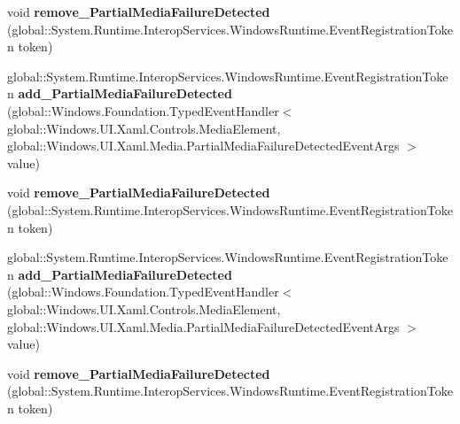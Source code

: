 \begin{DoxyCompactItemize}
\mbox{\label{interface_windows_1_1_u_i_1_1_xaml_1_1_controls_1_1_i_media_element3_a69e76e84315d2458547b9a6238fbbbf6}} 
void {\bfseries remove\+\_\+\+Partial\+Media\+Failure\+Detected} (global\+::\+System.\+Runtime.\+Interop\+Services.\+Windows\+Runtime.\+Event\+Registration\+Token token)
\item 
\mbox{\label{interface_windows_1_1_u_i_1_1_xaml_1_1_controls_1_1_i_media_element3_a690260fef718dc5d1a0404578b728d57}} 
global\+::\+System.\+Runtime.\+Interop\+Services.\+Windows\+Runtime.\+Event\+Registration\+Token {\bfseries add\+\_\+\+Partial\+Media\+Failure\+Detected} (global\+::\+Windows.\+Foundation.\+Typed\+Event\+Handler$<$ global\+::\+Windows.\+U\+I.\+Xaml.\+Controls.\+Media\+Element, global\+::\+Windows.\+U\+I.\+Xaml.\+Media.\+Partial\+Media\+Failure\+Detected\+Event\+Args $>$ value)
\item 
\mbox{\label{interface_windows_1_1_u_i_1_1_xaml_1_1_controls_1_1_i_media_element3_a69e76e84315d2458547b9a6238fbbbf6}} 
void {\bfseries remove\+\_\+\+Partial\+Media\+Failure\+Detected} (global\+::\+System.\+Runtime.\+Interop\+Services.\+Windows\+Runtime.\+Event\+Registration\+Token token)
\item 
\mbox{\label{interface_windows_1_1_u_i_1_1_xaml_1_1_controls_1_1_i_media_element3_a690260fef718dc5d1a0404578b728d57}} 
global\+::\+System.\+Runtime.\+Interop\+Services.\+Windows\+Runtime.\+Event\+Registration\+Token {\bfseries add\+\_\+\+Partial\+Media\+Failure\+Detected} (global\+::\+Windows.\+Foundation.\+Typed\+Event\+Handler$<$ global\+::\+Windows.\+U\+I.\+Xaml.\+Controls.\+Media\+Element, global\+::\+Windows.\+U\+I.\+Xaml.\+Media.\+Partial\+Media\+Failure\+Detected\+Event\+Args $>$ value)
\item 
\mbox{\label{interface_windows_1_1_u_i_1_1_xaml_1_1_controls_1_1_i_media_element3_a69e76e84315d2458547b9a6238fbbbf6}} 
void {\bfseries remove\+\_\+\+Partial\+Media\+Failure\+Detected} (global\+::\+System.\+Runtime.\+Interop\+Services.\+Windows\+Runtime.\+Event\+Registration\+Token token)

\end{DoxyCompactItemize}
